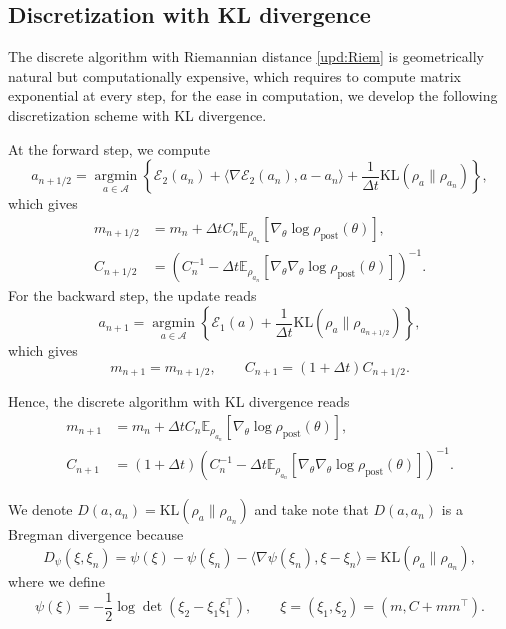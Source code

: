 \documentclass[11pt]{article}
\theoremstyle{plain}
\theoremstyle{definition}
\theoremstyle{remark}
\newcommand{\E}{\mathbb{E}}
\newcommand{\KL}{\mathrm{KL}}
\newcommand{\post}{\mathrm{post}}
\newcommand{\Aspace}{\mathcal{A}}
\begin{document}
\subsection{Discretization with KL divergence}

The discrete algorithm with Riemannian distance \eqref{upd:Riem} is geometrically natural but computationally expensive, which requires to compute matrix exponential at every step, for the ease in computation, we develop the following discretization scheme with KL divergence.

At the forward step, we compute
\begin{equation*}
    a_{n+1/2} = \operatorname*{argmin}_{a\in \Aspace} \left\{ \mathcal{E}_2 (a_n) + \langle \nabla \mathcal{E}_2 (a_n), a - a_n \rangle + \frac{1}{\Delta t} \KL (\rho_a \| \rho_{a_n}) \right\},
\end{equation*}
which gives
\begin{align*}
    m_{n+1/2} &= m_n + \Delta t C_n \E_{\rho_{a_n}} [\nabla_\theta \log \rho_\post (\theta)], \\
    C_{n+1/2} &= (C_n^{-1} - \Delta t \E_{\rho_{a_n}} [\nabla_\theta \nabla_\theta \log \rho_\post (\theta)])^{-1}.
\end{align*}
For the backward step, the update reads
\begin{equation*}
    a_{n+1} = \operatorname*{argmin}_{a \in \Aspace} \left\{ \mathcal{E}_1 (a) + \frac{1}{\Delta t} \KL (\rho_a \| \rho_{a_{n+1/2}}) \right\},
\end{equation*}
which gives
\begin{equation*}
    m_{n+1} = m_{n+1/2}, \qquad C_{n+1} = (1 + \Delta t) C_{n+1/2}.
\end{equation*}

Hence, the discrete algorithm with KL divergence reads
\begin{equation}\label{upd:KL}
    \begin{aligned}
        m_{n+1} &= m_n + \Delta t C_n \E_{\rho_{a_n}} [\nabla_\theta \log \rho_\post (\theta)], \\
        C_{n+1} &= (1 + \Delta t) (C_n^{-1} - \Delta t \E_{\rho_{a_n}} [\nabla_\theta \nabla_\theta \log \rho_\post (\theta)])^{-1}.
    \end{aligned}
\end{equation}

We denote $D (a, a_n) = \KL (\rho_{a} \| \rho_{a_n})$ and take note that $D(a, a_n)$ is a Bregman divergence because 
\begin{equation*}
    D_\psi (\xi, \xi_n) = \psi (\xi) - \psi (\xi_n) - \langle \nabla \psi (\xi_n), \xi - \xi_n \rangle = \KL (\rho_a \| \rho_{a_n}),
\end{equation*}
where we define
\begin{equation*}
    \psi (\xi) = -\frac{1}{2} \log\det (\xi_2 - \xi_1 \xi_1^\top), \qquad \xi = (\xi_1, \xi_2) = (m, C + mm^\top).
\end{equation*}
\end{document}
